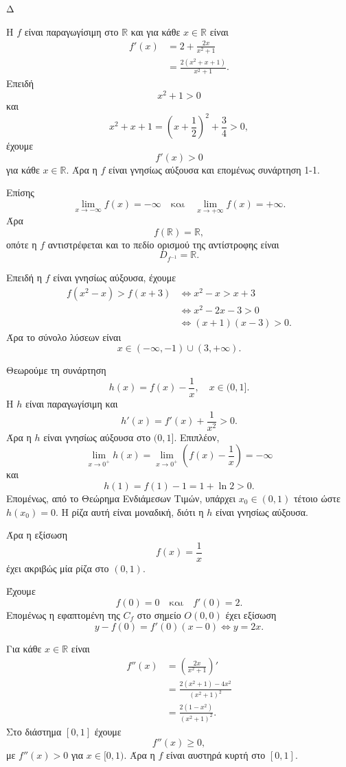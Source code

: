 \begin{thema}{Δ}
\begin{erwthma}
\item Η $f$ είναι παραγωγίσιμη στο $\mathbb{R}$ και για κάθε $x\in\mathbb{R}$ είναι
\begin{align*}
f'(x)
&=2+\frac{2x}{x^2+1}\\
&=\frac{2(x^2+x+1)}{x^2+1}.
\end{align*}
Επειδή
\[
x^2+1>0
\]
και
\[
x^2+x+1=\left(x+\frac{1}{2}\right)^2+\frac{3}{4}>0,
\]
έχουμε
\[
f'(x)>0
\]
για κάθε $x\in\mathbb{R}$. Άρα η $f$ είναι γνησίως αύξουσα και επομένως συνάρτηση 1-1.

Επίσης
\[
\lim_{x\to-\infty}f(x)=-\infty
\quad\text{και}\quad
\lim_{x\to+\infty}f(x)=+\infty.
\]
Άρα
\[
f(\mathbb{R})=\mathbb{R},
\]
οπότε η $f$ αντιστρέφεται και το πεδίο ορισμού της αντίστροφης είναι
\[
{D_{f^{-1}}=\mathbb{R}}.
\]

Επειδή η $f$ είναι γνησίως αύξουσα, έχουμε
\begin{align*}
f(x^2-x)>f(x+3)
&\Leftrightarrow x^2-x>x+3\\
&\Leftrightarrow x^2-2x-3>0\\
&\Leftrightarrow (x+1)(x-3)>0.
\end{align*}
Άρα το σύνολο λύσεων είναι
\[
{x\in(-\infty,-1)\cup(3,+\infty)}.
\]

\item Θεωρούμε τη συνάρτηση
\[
h(x)=f(x)-\frac{1}{x},
\quad x\in(0,1].
\]
Η $h$ είναι παραγωγίσιμη και
\[
h'(x)=f'(x)+\frac{1}{x^2}>0.
\]
Άρα η $h$ είναι γνησίως αύξουσα στο $(0,1]$. Επιπλέον,
\[
\lim_{x\to0^+}h(x)
=\lim_{x\to0^+}\left(f(x)-\frac{1}{x}\right)
=-\infty
\]
και
\[
h(1)=f(1)-1=1+\ln2>0.
\]
Επομένως, από το Θεώρημα Ενδιάμεσων Τιμών, υπάρχει $x_0\in(0,1)$ τέτοιο ώστε $h(x_0)=0$. Η ρίζα αυτή είναι μοναδική, διότι η $h$ είναι γνησίως αύξουσα.

Άρα η εξίσωση
\[
f(x)=\frac{1}{x}
\]
έχει ακριβώς μία ρίζα στο $(0,1)$.

\item Έχουμε
\[
f(0)=0
\quad\text{και}\quad
f'(0)=2.
\]
Επομένως η εφαπτομένη της $C_f$ στο σημείο $O(0,0)$ έχει εξίσωση
\[
y-f(0)=f'(0)(x-0)
\Leftrightarrow
{y=2x}.
\]

Για κάθε $x\in\mathbb{R}$ είναι
\begin{align*}
f''(x)
&=\left(\frac{2x}{x^2+1}\right)'\\
&=\frac{2(x^2+1)-4x^2}{(x^2+1)^2}\\
&=\frac{2(1-x^2)}{(x^2+1)^2}.
\end{align*}
Στο διάστημα $[0,1]$ έχουμε
\[
f''(x)\geq0,
\]
με $f''(x)>0$ για $x\in[0,1)$. Άρα η $f$ είναι αυστηρά κυρτή στο $[0,1]$.


\end{erwthma}
\end{thema}
